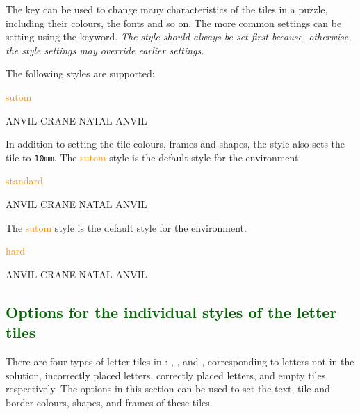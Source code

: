 \documentclass[svgnames]{report}
\newcommand\Section[1]{\subsection{\textcolor{DarkGreen}{#1}}}
\begin{document}
  The  key can be used to change many characteristics of
  the tiles in a  puzzle, including their colours, the
  fonts and so on.  The more common settings can be setting using the
   keyword. \textit{The style should always be set first
  because, otherwise, the style settings may override earlier settings.}

  The following styles are supported:

  \textcolor{DarkOrange}{sutom}

  \begin{example}
    \begin{wordle}[style=sutom]{ANVIL}
      CRANE
      NATAL
      ANVIL
    \end{wordle}
  \end{example}

  In addition to setting the tile colours, frames and shapes, the
   style also sets the tile  to
  \texttt{10mm}.  The \textcolor{DarkOrange}{sutom} style is the default
  style for the  environment.

  \textcolor{DarkOrange}{standard}

  \begin{example}
    \begin{wordle}[style=standard]{ANVIL}
      CRANE
      NATAL
      ANVIL
    \end{wordle}
  \end{example}

  The \textcolor{DarkOrange}{sutom} style is the default style for the
   environment.

  \textcolor{DarkOrange}{hard}

  \begin{example}
    \begin{wordle}[style=hard]{ANVIL}
      CRANE
      NATAL
      ANVIL
    \end{wordle}
  \end{example}

  \Section{Options for the individual styles of the letter tiles}

  There are four types of letter tiles in :
  , ,  and
  , corresponding to letters not in the solution,
  incorrectly placed letters, correctly placed letters, and empty
  tiles, respectively. The options in this section can be used to set
  the text, tile and border colours, shapes, and frames of these tiles.
\end{document}
